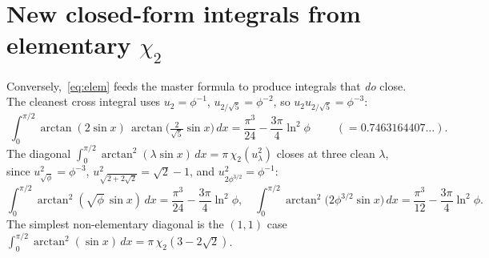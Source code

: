 \documentclass[11pt]{article}
\newcommand{\chitwo}{\chi_{2}}
\theoremstyle{plain}\newtheorem{theorem}{Theorem}\newtheorem{proposition}[theorem]{Proposition}
\theoremstyle{remark}\newtheorem{remark}[theorem]{Remark}
\begin{document}
\section{New closed-form integrals from elementary $\chitwo$}
Conversely,~\eqref{eq:elem} feeds the master formula to produce integrals that \emph{do} close. The
cleanest cross integral uses $u_2=\phi^{-1}$, $u_{2/\sqrt5}=\phi^{-2}$, so $u_2u_{2/\sqrt5}=\phi^{-3}$:
\begin{equation}\label{eq:A}
  \boxed{\;\int_0^{\pi/2}\arctan(2\sin x)\,\arctan\!\bigl(\tfrac2{\sqrt5}\sin x\bigr)\,dx
  =\frac{\pi^3}{24}-\frac{3\pi}{4}\ln^2\phi\;}\qquad(=0.7463164407\ldots).
\end{equation}
The diagonal $\int_0^{\pi/2}\arctan^2(\lambda\sin x)\,dx=\pi\,\chitwo(u_\lambda^2)$ closes at three clean
$\lambda$, since $u_{\sqrt\phi}^2=\phi^{-3}$, $u_{\sqrt{2+2\sqrt2}}^2=\sqrt2-1$, and $u_{2\phi^{3/2}}^2=\phi^{-1}$:
\begin{equation}\label{eq:diag}
  \int_0^{\pi/2}\!\arctan^2(\sqrt\phi\,\sin x)\,dx=\frac{\pi^3}{24}-\frac{3\pi}{4}\ln^2\phi,\quad
  \int_0^{\pi/2}\!\arctan^2\!\bigl(2\phi^{3/2}\sin x\bigr)\,dx=\frac{\pi^3}{12}-\frac{3\pi}{4}\ln^2\phi.
\end{equation}
The simplest non-elementary diagonal is the $(1,1)$ case $\int_0^{\pi/2}\arctan^2(\sin x)\,dx=\pi\,\chitwo(3-2\sqrt2)$.
\end{document}
